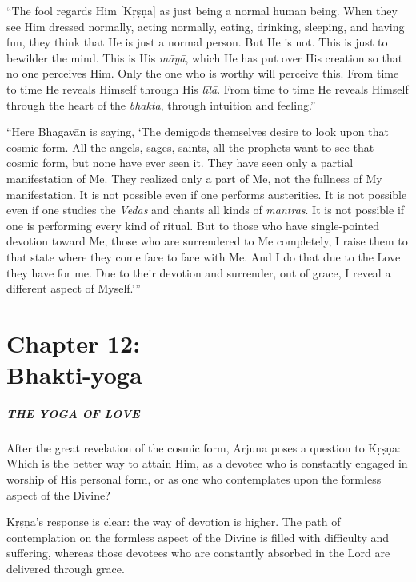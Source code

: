 \documentclass[12pt, twoside, openright]{memoir}
\begin{document}
\enquote{The fool regards Him [Kṛṣṇa] as just being a normal human being. When they see Him dressed normally, acting normally, eating, drinking, sleeping, and having fun, they think that He is just a normal person. But He is not. This is just to bewilder the mind. This is His \textit{māyā}, which He has put over His creation so that no one perceives Him. Only the one who is worthy will perceive this. From time to time He reveals Himself through His \textit{līlā}. From time to time He reveals Himself through the heart of the \textit{bhakta}, through intuition and feeling.}

\enquote{Here Bhagavān is saying, \enquote{The demigods themselves desire to look upon that cosmic form. All the angels, sages, saints, all the prophets want to see that cosmic form, but none have ever seen it. They have seen only a partial manifestation of Me. They realized only a part of Me, not the fullness of My manifestation. It is not possible even if one performs austerities. It is not possible even if one studies the \textit{Vedas} and chants all kinds of \textit{mantras}. It is not possible if one is performing every kind of ritual. But to those who have single-pointed devotion toward Me, those who are surrendered to Me completely, I raise them to that state where they come face to face with Me. And I do that due to the Love they have for me. Due to their devotion and surrender, out of grace, I reveal a different aspect of Myself.}} \chapter{Chapter 12: \\Bhakti-yoga}\label{chap-bhakti-yoga}

\paragraph*{\MakeUppercase{The Yoga of Love}}


\noindent After the great revelation of the cosmic form, Arjuna poses a question to Kṛṣṇa: Which is the better way to attain Him, as a devotee who is constantly engaged in worship of His personal form, or as one who contemplates upon the formless aspect of the Divine?

Kṛṣṇa's response is clear: the way of devotion is higher. The path of contemplation on the formless aspect of the Divine is filled with difficulty and suffering, whereas those devotees who are constantly absorbed in the Lord are delivered through grace.
\end{document}
